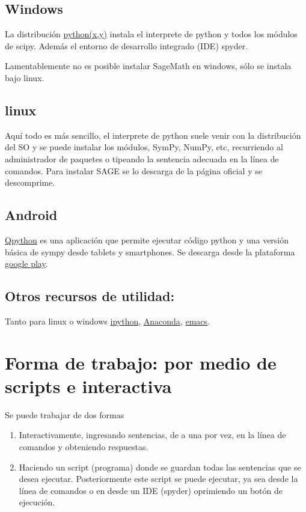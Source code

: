 \subsection{Windows} La distribución  \href{https://code.google.com/p/pythonxy/}{python(x,y)}  instala el interprete de python y todos los módulos de scipy. Además el entorno de desarrollo integrado (IDE) spyder.

Lamentablemente no es posible instalar SageMath en windows, sólo se instala bajo linux.

\subsection{linux} Aquí todo es más sencillo, el interprete de python suele venir con la distribución del SO y se puede instalar los módulos, SymPy, NumPy, etc, recurriendo al administrador de paquetes o tipeando la sentencia adecuada en la línea de comandos.  Para instalar SAGE se lo descarga de la página oficial y se descomprime.

\subsection{Android} \href{http://qpython.com/}{Qpython} es una aplicación que permite ejecutar código python y una versión básica de sympy desde tablets y smartphones. Se descarga desde la plataforma \href{https://play.google.com/store/apps/details?id=com.hipipal.qpyplus}{google play}.

\subsection{Otros recursos de utilidad:} Tanto para linux o windows \href{http://ipython.org}{ipython}, \href{http://continuum.io/downloads}{Anaconda}, \href{http://www.gnu.org/software/emacs/}{emacs}.


\section{Forma de trabajo: por medio de scripts e interactiva}


Se puede trabajar de dos formas

\begin{enumerate}
\item Interactivamente, ingresando sentencias, de a una por vez, en la línea de comandos y obteniendo respuestas.

\item Haciendo un script (programa) donde se guardan todas las sentencias que se desea ejecutar. Posteriormente este script se puede ejecutar, ya sea desde la línea de comandos o en desde un IDE (spyder) oprimiendo un botón de ejecución.

\end{enumerate}






